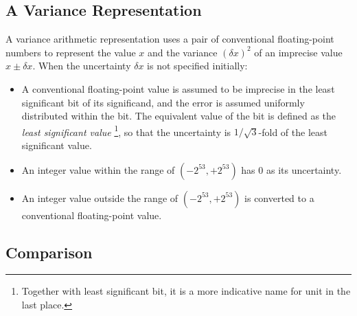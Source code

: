 \documentclass[twoside]{article}
\numberwithin{equation}{section}
\begin{document}
\subsection{A Variance Representation}

A variance arithmetic representation uses a pair of conventional floating-point numbers to represent the value $x$ and the variance $(\delta x)^2$ of an imprecise value $x \pm \delta x$.
When the uncertainty $\delta x$ is not specified initially:
\begin{itemize}
\item A conventional floating-point value is assumed to be imprecise in the least significant bit of its significand, and the error is assumed uniformly distributed within the bit.
The equivalent value of the bit is defined as the \emph{least significant value} \footnote{Together with least significant bit, it is a more indicative name for unit in the last place.}, so that the uncertainty is $1/\sqrt{3}$-fold of the least significant value.

\item An integer value within the range of $(-2^{53}, +2^{53})$ has 0 as its uncertainty.

\item An integer value outside the range of $(-2^{53}, +2^{53})$ is converted to a conventional floating-point value.
\end{itemize}


\subsection{Comparison}

\iffalse
\end{document}
